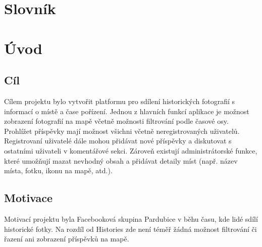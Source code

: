 \chapter{Slovník}


\chapter{Úvod}
\section{Cíl}
Cílem projektu bylo vytvořit platformu pro sdílení historických fotografií
s informací o místě a čase pořízení. Jednou z hlavních funkcí aplikace je možnost
zobrazení fotografií na mapě včetně možnosti filtrování podle časové osy. Prohlížet 
příspěvky mají možnost všichni včetně neregistrovaných uživatelů. Registrovaní 
uživatelé dále mohou přidávat nové příspěvky a diskutovat s ostatními uživateli v
komentářové sekci. Zároveň existují administrátorské funkce, které umožňují mazat
nevhodný obsah a přidávat detaily míst (např. název místa, fotku, ikonu na mapě, atd.).

\section{Motivace}
Motivací projektu byla Facebooková skupina Pardubice v běhu času\cite{PardubiceVBehuCasuFB}, kde lidé 
sdílí historické fotky. Na rozdíl od Histories zde není téměř žádná možnost filtrování či 
řazení ani zobrazení příspěvků na mapě.
